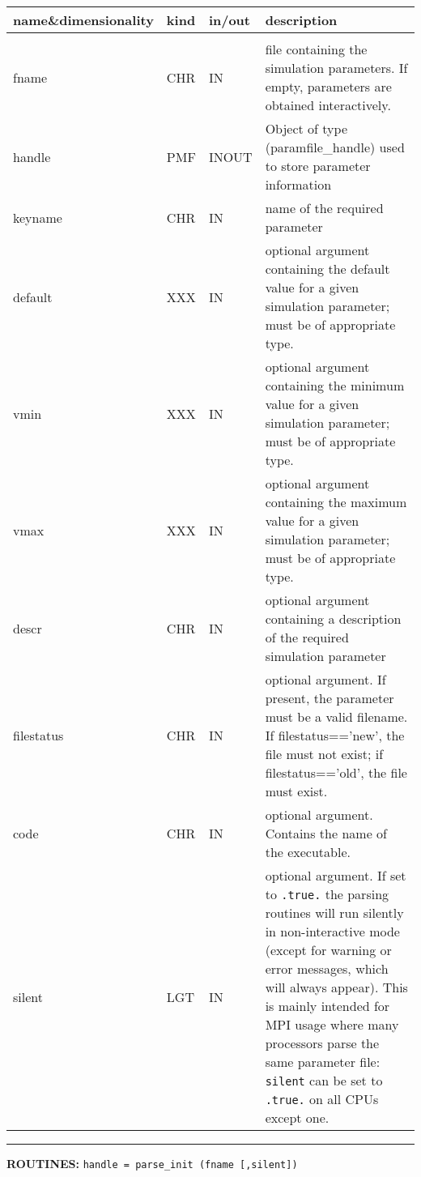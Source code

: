 \begin{arguments}
{
\begin{tabular}{p{0.3\hsize} p{0.05\hsize} p{0.1\hsize} p{0.45\hsize}} \hline  
\textbf{name\&dimensionality} & \textbf{kind} & \textbf{in/out} & \textbf{description} \\ \hline
                   &   &   &                           \\ %
fname & CHR & IN & file containing the simulation parameters.
                   If empty, parameters are obtained interactively.\\
handle & PMF & INOUT & Object of type (paramfile\_handle) used to store parameter information \\
keyname & CHR & IN & name of the required parameter \\
default & XXX & IN & optional argument containing the default value for
                     a given simulation parameter; must be of
                     appropriate type. \\
vmin & XXX & IN & optional argument containing the minimum value for
                     a given simulation parameter; must be of
                     appropriate type. \\
vmax & XXX & IN & optional argument containing the maximum value for
                     a given simulation parameter; must be of
                     appropriate type. \\
descr & CHR & IN & optional argument containing a description of the
                   required simulation parameter \\
filestatus & CHR & IN & optional argument. If present, the parameter
                   must be a valid filename. If filestatus=='new',
                   the file must not exist; if filestatus=='old',
                   the file must exist. \\
code & CHR & IN & optional argument. Contains the name of the executable.\\
silent & LGT & IN & optional argument. If set to {\tt .true.} the parsing
routines will run silently in non-interactive mode (except for warning or error
messages, which will always appear). This is mainly intended for MPI usage where
many processors parse the same parameter file: {\tt silent} can be set to
{\tt .true.} on all CPUs except one.
\end{tabular}
}
\end{arguments}
\newpage

\rule{\hsize}{0.7mm}
\textsc{\large{\textbf{ROUTINES: }}}\hfill\newline
{\tt handle = parse\_init (fname [,silent])} 

